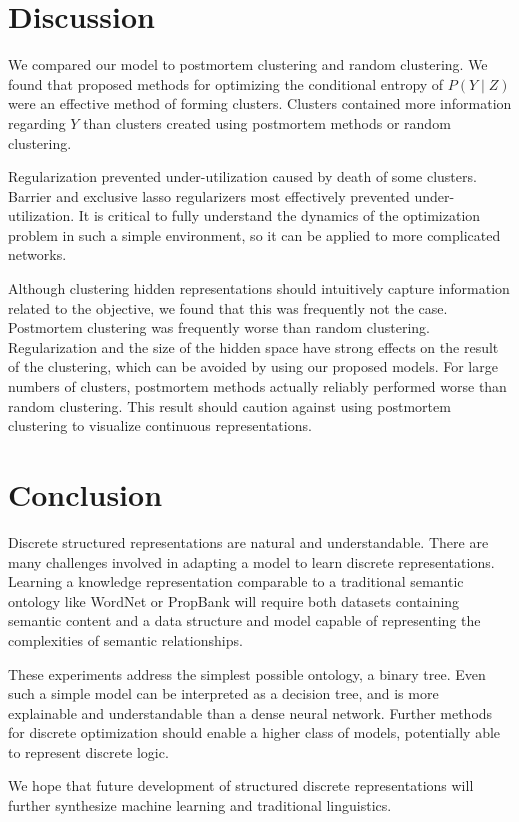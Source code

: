 \documentclass[11pt,letterpaper]{article}
\begin{document}
\section{Discussion}

We compared our model to postmortem clustering and random clustering. We found that proposed methods for optimizing the conditional entropy of $P(Y\mid Z)$ were an effective method of forming clusters. Clusters contained more information regarding $Y$ than clusters created using postmortem methods or random clustering.

Regularization prevented under-utilization caused by death of some clusters. Barrier and exclusive lasso regularizers most effectively prevented under-utilization. It is critical to fully understand the dynamics of the optimization problem in such a simple environment, so it can be applied to more complicated networks.

Although clustering hidden representations should intuitively capture information related to the objective, we found that this was frequently not the case. Postmortem clustering was frequently worse than random clustering. Regularization and the size of the hidden space have strong effects on the result of the clustering, which can be avoided by using our proposed models. For large numbers of clusters, postmortem methods actually reliably performed worse than random clustering. This result should caution against using postmortem clustering to visualize continuous representations.

\section{Conclusion}
Discrete structured representations are natural and understandable. There are many challenges involved in adapting a model to learn discrete representations. Learning a knowledge representation comparable to a traditional semantic ontology like WordNet or PropBank will require both datasets containing semantic content and a data structure and model capable of representing the complexities of semantic relationships.

These experiments address the simplest possible ontology, a binary tree. Even such a simple model can be interpreted as a decision tree, and is more explainable and understandable than a dense neural network. Further methods for discrete optimization should enable a higher class of models, potentially able to represent discrete logic.

We hope that future development of structured discrete representations will further synthesize machine learning and traditional linguistics.



\end{document}
